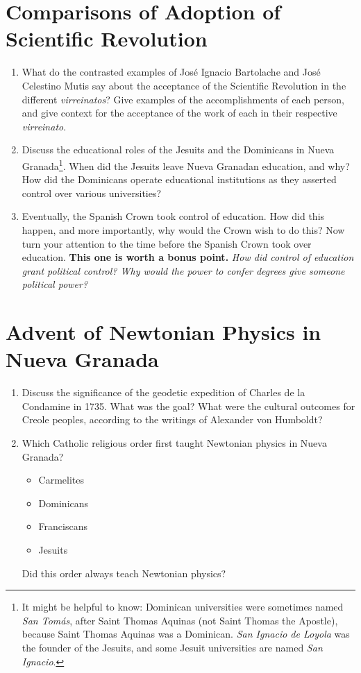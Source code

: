 \documentclass[10pt]{article}
\begin{document}
\section{Comparisons of Adoption of Scientific Revolution}

\begin{enumerate}
\item What do the contrasted examples of Jos\'{e} Ignacio Bartolache and Jos\'{e} Celestino Mutis say about the acceptance of the Scientific Revolution in the different \textit{virreinatos}? Give examples of the accomplishments of each person, and give context for the acceptance of the work of each in their respective \textit{virreinato}. \\ \vspace{3cm}
\item Discuss the educational roles of the Jesuits and the Dominicans in Nueva Granada\footnote{It might be helpful to know: Dominican universities were sometimes named \textit{San Tom\'{a}s}, after Saint Thomas Aquinas (not Saint Thomas the Apostle), because Saint Thomas Aquinas was a Dominican.  \textit{San Ignacio de Loyola} was the founder of the Jesuits, and some Jesuit universities are named \textit{San Ignacio}.}.  When did the Jesuits leave Nueva Granadan education, and why?  How did the Dominicans operate educational institutions as they asserted control over various universities? \\ \vspace{3cm}
\item Eventually, the Spanish Crown took control of education.  How did this happen, and more importantly, why would the Crown wish to do this?  Now turn your attention to the time before the Spanish Crown took over education.  \textbf{This one is worth a bonus point.}  \textit{How did control of education grant political control?  Why would the power to confer degrees give someone political power?} \\ \vspace{3cm}
\end{enumerate}

\section{Advent of Newtonian Physics in Nueva Granada}

\begin{enumerate}
\item Discuss the significance of the geodetic expedition of Charles de la Condamine in 1735.  What was the goal?  What were the cultural outcomes for Creole peoples, according to the writings of Alexander von Humboldt? \\ \vspace{1cm}
\item Which Catholic religious order first taught Newtonian physics in Nueva Granada?
\begin{itemize}
\item Carmelites
\item Dominicans
\item Franciscans
\item Jesuits
\end{itemize}
Did this order always teach Newtonian physics?
\end{enumerate}
\end{document}
